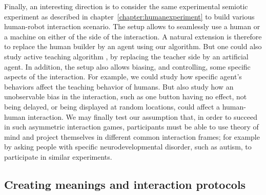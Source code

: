 Finally, an interesting direction is to consider the same experimental semiotic experiment as described in chapter~\ref{chapter:humanexperiment} to build various human-robot interaction scenario. The setup allows to seamlessly use a human or a machine on either of the side of the interaction. A natural extension is therefore to replace the human builder by an agent using our algorithm. But one could also study active teaching algorithm \cite{cakmak2012algorithmic}, by replacing the teacher side by an artificial agent. In addition, the setup also allows biasing, and controlling, some specific aspects of the interaction. For example, we could study how specific agent's behaviors affect the teaching behavior of humans. But also study how an unobservable bias in the  interaction, such as one button having no effect, not being delayed, or being displayed at random locations, could affect a human-human interaction. We may finally test our assumption that, in order to succeed in such asymmetric interaction games, participants must be able to use theory of mind and project themselves in different common interaction frames; for example by asking people with specific neurodevelopmental disorder, such as autism, to participate in similar experiments.





\subsection*{Creating meanings and interaction protocols}




